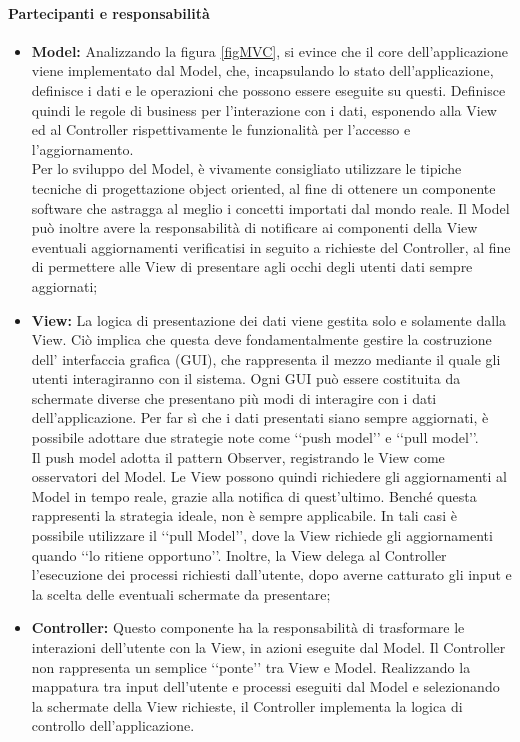 \paragraph{Partecipanti e responsabilità}
\begin{itemize}
\item \textbf{Model:}
Analizzando la figura \ref{figMVC}, si evince che il core dell'applicazione viene implementato dal Model, che, incapsulando lo stato dell'applicazione, definisce i dati e le operazioni che possono essere eseguite su questi. Definisce quindi le regole di business per l'interazione con i dati, esponendo alla View ed al Controller rispettivamente le funzionalità per l'accesso e l'aggiornamento.\\
Per lo sviluppo del Model, è vivamente consigliato utilizzare le tipiche tecniche di progettazione object oriented, al fine di ottenere un componente software che astragga al meglio i concetti importati dal mondo reale. Il Model può inoltre avere la responsabilità di notificare ai componenti della View eventuali aggiornamenti verificatisi in seguito a richieste del Controller, al fine di permettere alle View di presentare agli occhi degli utenti dati sempre aggiornati;

\item \textbf{View:}
La logica di presentazione dei dati viene gestita solo e solamente dalla View. Ciò implica che questa deve fondamentalmente gestire la costruzione dell' interfaccia grafica (GUI\glossario{}), che rappresenta il mezzo mediante il quale gli utenti interagiranno con il sistema. Ogni GUI\glossario{} può essere costituita da schermate diverse che presentano più modi di interagire con i dati dell'applicazione. Per far sì che i dati presentati siano sempre aggiornati, è possibile adottare due strategie note come \lq\lq{}push model\rq\rq{} e \lq\lq{}pull model\rq\rq{}.\\
Il push model adotta il pattern Observer, registrando le View come osservatori del Model. Le View possono quindi richiedere gli aggiornamenti al Model in tempo reale, grazie alla notifica di quest'ultimo. Benché questa rappresenti la strategia ideale, non è sempre applicabile. In tali casi è possibile utilizzare il \lq\lq{}pull Model\rq\rq{}, dove la View richiede gli aggiornamenti quando \lq\lq{}lo ritiene opportuno\rq\rq{}. Inoltre, la View delega al Controller l'esecuzione dei processi richiesti dall'utente, dopo averne catturato gli input e la scelta delle eventuali schermate da presentare;

\item \textbf{Controller:}
Questo componente ha la responsabilità di trasformare le interazioni dell'utente con la View, in azioni eseguite dal Model. Il Controller non rappresenta un semplice \lq\lq{}ponte\rq\rq{} tra View e Model. Realizzando la mappatura tra input dell'utente e processi eseguiti dal Model e selezionando la schermate della View richieste, il Controller implementa la logica di controllo dell'applicazione.
\end{itemize}

